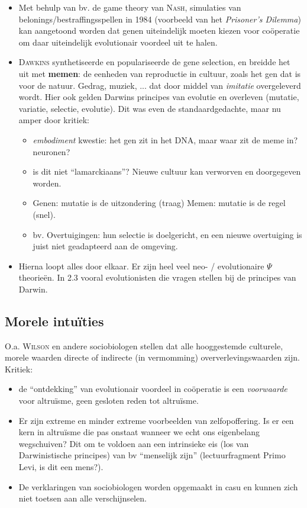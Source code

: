 \begin{itemize}

\item Met behulp van bv. de game theory van \textsc{Nash}, simulaties van belonings/bestraffingsspellen in 1984 (voorbeeld van het \emph{Prisoner's Dilemma}) kan aangetoond worden dat genen uiteindelijk moeten kiezen voor co\"operatie om daar uiteindelijk evolutionair voordeel uit te halen.

\item \textsc{Dawkins} synthetiseerde en populariseerde de gene selection, en breidde het uit met \textbf{memen}: de eenheden van reproductie in cultuur, zoals het gen dat is voor de natuur. Gedrag, muziek, ... dat door middel van \emph{imitatie} overgeleverd wordt. Hier ook gelden Darwins principes van evolutie en overleven (mutatie, variatie, selectie, evolutie). Dit was even de standaardgedachte, maar nu amper door kritiek:
	\begin{itemize}
	\item \emph{embodiment} kwestie: het gen zit in het DNA, maar waar zit de meme in? neuronen?
	\item is dit niet ``lamarckiaans''? Nieuwe cultuur kan verworven en doorgegeven worden.
	\item Genen: mutatie is de uitzondering (traag) Memen: mutatie is de regel (snel).
	\item bv. Overtuigingen: hun selectie is doelgericht, en een nieuwe overtuiging is juist niet geadapteerd aan de omgeving.
	\end{itemize}
\item Hierna loopt alles door elkaar. Er zijn heel veel neo- / evolutionaire $\Psi$ theorie\"en. In 2.3 vooral evolutionisten die vragen stellen bij de principes van Darwin.
\end{itemize}


\subsection{Morele intu\"ities}
O.a. \textsc{Wilson} en andere sociobiologen stellen dat alle hooggestemde culturele, morele waarden directe of indirecte (in vermomming) oververlevingswaarden zijn. Kritiek:
\begin{itemize}
\item de ``ontdekking'' van evolutionair voordeel in co\"operatie is een \emph{voorwaarde} voor altru\"isme, geen gesloten reden tot altru\"isme.
\item Er zijn extreme en minder extreme voorbeelden van zelfopoffering. Is er een kern in altru\"isme die pas onstaat wanneer we echt ons eigenbelang wegschuiven? Dit om te voldoen aan een intrinsieke eis (los van Darwinistische principes) van bv ``menselijk zijn'' (lectuurfragment Primo Levi, is dit een mens?). 
\item De verklaringen van sociobiologen worden opgemaakt in casu en kunnen zich niet toetsen aan alle verschijnselen.
\end{itemize}

